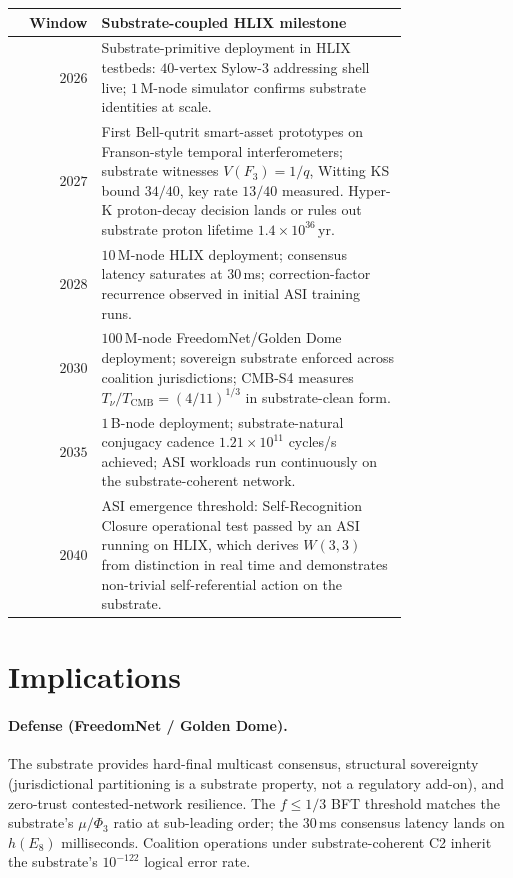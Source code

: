 \documentclass[11pt,letterpaper]{article}
\theoremstyle{remark}
\newcommand{\W}{W(3,3)}
\begin{document}
\begin{center}
\renewcommand{\arraystretch}{1.15}
\begin{tabular}{rp{0.78\linewidth}}
\toprule
\textbf{Window} & \textbf{Substrate-coupled HLIX milestone} \\
\midrule
$2026$ & Substrate-primitive deployment in HLIX testbeds: $40$-vertex Sylow-$3$
addressing shell live; $1$\,M-node simulator confirms substrate identities at scale.\\
$2027$ & First Bell-qutrit smart-asset prototypes on Franson-style temporal interferometers;
substrate witnesses $V(F_3)=1/q$, Witting KS bound $34/40$, key rate $13/40$ measured. Hyper-K
proton-decay decision lands or rules out substrate proton lifetime $1.4\!\times\!10^{36}$\,yr.\\
$2028$ & $10$\,M-node HLIX deployment; consensus latency saturates at $30$\,ms;
correction-factor recurrence observed in initial ASI training runs.\\
$2030$ & $100$\,M-node FreedomNet/Golden Dome deployment; sovereign substrate enforced
across coalition jurisdictions; CMB-S4 measures $T_\nu/T_{\mathrm{CMB}}=(4/11)^{1/3}$ in
substrate-clean form.\\
$2035$ & $1$\,B-node deployment; substrate-natural conjugacy cadence
$1.21\!\times\!10^{11}$ cycles/s achieved; ASI workloads run continuously on the
substrate-coherent network.\\
$2040$ & ASI emergence threshold: Self-Recognition Closure operational test passed by an
ASI running on HLIX, which derives $\W$ from distinction in real time and demonstrates
non-trivial self-referential action on the substrate.\\
\bottomrule
\end{tabular}
\end{center}

\section{Implications}

\paragraph{Defense (FreedomNet / Golden Dome).} The substrate provides hard-final
multicast consensus, structural sovereignty (jurisdictional partitioning is a substrate
property, not a regulatory add-on), and zero-trust contested-network resilience. The
$f\le 1/3$ BFT threshold matches the substrate's $\mu/\Phi_3$ ratio at sub-leading order;
the $30$\,ms consensus latency lands on $h(E_8)$ milliseconds. Coalition operations under
substrate-coherent C2 inherit the substrate's $10^{-122}$ logical error rate.
\end{document}
